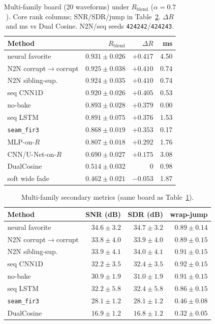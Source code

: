 \begin{table}[htbp]
  \centering
  \caption{Multi-family board (20 waveforms) under $R_{\mathrm{blend}}$ ($\alpha{=}0.7$).
  Core rank columns; SNR/SDR/jump in Table~\ref{tab:sota-main-metrics}.
  $\Delta R$ and ms vs Dual Cosine. N2N/seq seeds \texttt{424242}/\texttt{424243}.}
  \label{tab:sota-main}
  \setlength{\tabcolsep}{3pt}
  \footnotesize
  \begin{tabular}{@{}lrrr@{}}
    \toprule
    Method & $R_{\mathrm{blend}}$ & $\Delta R$ & ms \\
    \midrule
    neural favorite & $0.931\pm0.026$ & ${+}0.417$ & 4.50 \\
    N2N corrupt$\to$corrupt & $0.925\pm0.038$ & ${+}0.410$ & 0.74 \\
    N2N sibling-sup. & $0.924\pm0.035$ & ${+}0.410$ & 0.74 \\
    seq CNN1D & $0.920\pm0.026$ & ${+}0.405$ & 0.53 \\
    no-bake & $0.893\pm0.028$ & ${+}0.379$ & 0.00 \\
    seq LSTM & $0.891\pm0.075$ & ${+}0.376$ & 1.53 \\
    \texttt{seam\_fir3} & $0.868\pm0.019$ & ${+}0.353$ & 0.17 \\
    MLP-on-$R$ & $0.807\pm0.018$ & ${+}0.292$ & 1.76 \\
    CNN/U-Net-on-$R$ & $0.690\pm0.027$ & ${+}0.175$ & 3.08 \\
    DualCosine & $0.514\pm0.032$ & $0$ & 0.98 \\
    soft wide fade & $0.462\pm0.021$ & ${-}0.053$ & 1.87 \\
    \bottomrule
  \end{tabular}
\end{table}

\begin{table}[htbp]
  \centering
  \caption{Multi-family secondary metrics (same board as Table~\ref{tab:sota-main}).}
  \label{tab:sota-main-metrics}
  \setlength{\tabcolsep}{3pt}
  \footnotesize
  \begin{tabular}{@{}lrrr@{}}
    \toprule
    Method & SNR (dB) & SDR (dB) & wrap-jump \\
    \midrule
    neural favorite & $34.6\pm3.2$ & $34.7\pm3.2$ & $0.89\pm0.14$ \\
    N2N corrupt$\to$corrupt & $33.8\pm4.0$ & $33.9\pm4.0$ & $0.89\pm0.15$ \\
    N2N sibling-sup. & $33.9\pm4.1$ & $34.0\pm4.1$ & $0.91\pm0.15$ \\
    seq CNN1D & $32.2\pm3.5$ & $32.4\pm3.5$ & $0.92\pm0.15$ \\
    no-bake & $30.9\pm1.9$ & $31.0\pm1.9$ & $0.91\pm0.15$ \\
    seq LSTM & $32.2\pm5.8$ & $32.4\pm5.8$ & $0.86\pm0.15$ \\
    \texttt{seam\_fir3} & $28.1\pm1.2$ & $28.1\pm1.2$ & $0.46\pm0.08$ \\
    DualCosine & $16.9\pm1.2$ & $16.8\pm1.2$ & $0.32\pm0.05$ \\
    \bottomrule
  \end{tabular}
\end{table}





